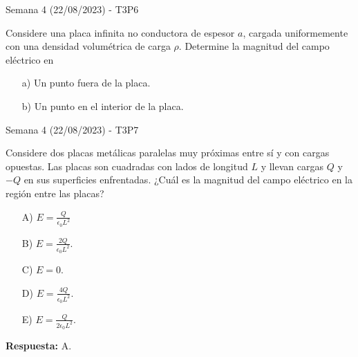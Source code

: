 \begin{frame}{Semana 4 (22/08/2023) - T3P6}
    
    Considere una placa infinita no conductora de espesor $a$, cargada uniformemente con una densidad volum\'etrica de carga $\rho$. Determine la magnitud del campo el\'ectrico en
    
    \begin{itemize}
        \item[a)] Un punto fuera de la placa.
        \item[b)] Un punto en el interior de la placa.
    \end{itemize}
    
\end{frame}

\begin{frame}{Semana 4 (22/08/2023) - T3P7}
    
    Considere dos placas metálicas paralelas muy próximas entre sí y con cargas opuestas. Las placas son cuadradas con lados de longitud $L$ y llevan cargas $Q$ y $-Q$ en sus superficies enfrentadas. ¿Cuál es la magnitud del campo eléctrico en la región entre las placas?
    
    \begin{itemize}
        \item[A)] $E = \frac{Q}{\epsilon_0L^2}$
        \item[B)] $E = \frac{2Q}{\epsilon_0L^2}$.
        \item[C)] $E=0$.
        \item[D)] $E = \frac{4Q}{\epsilon_0L^2}$.
        \item[E)] $E = \frac{Q}{2\epsilon_0L^2}$.
    \end{itemize}
    
    \pause\bigskip\centering\textbf{Respuesta:} A.
    
\end{frame}

